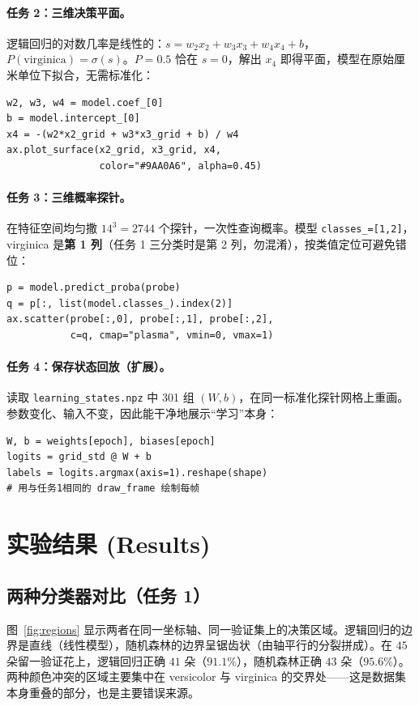 \documentclass[a4paper,11pt]{article}
\begin{document}
\paragraph{任务 2：三维决策平面。}
逻辑回归的对数几率是线性的：$s=w_2x_2+w_3x_3+w_4x_4+b$，$P(\text{virginica})=\sigma(s)$。$P=0.5$ 恰在 $s=0$，解出 $x_4$ 即得平面，模型在原始厘米单位下拟合，无需标准化：
\begin{lstlisting}
w2, w3, w4 = model.coef_[0]
b = model.intercept_[0]
x4 = -(w2*x2_grid + w3*x3_grid + b) / w4
ax.plot_surface(x2_grid, x3_grid, x4,
                color="#9AA0A6", alpha=0.45)
\end{lstlisting}

\paragraph{任务 3：三维概率探针。}
在特征空间均匀撒 $14^3=2744$ 个探针，一次性查询概率。模型 \texttt{classes\_=[1,2]}，virginica 是\textbf{第 1 列}（任务 1 三分类时是第 2 列，勿混淆），按类值定位可避免错位：
\begin{lstlisting}
p = model.predict_proba(probe)
q = p[:, list(model.classes_).index(2)]
ax.scatter(probe[:,0], probe[:,1], probe[:,2],
           c=q, cmap="plasma", vmin=0, vmax=1)
\end{lstlisting}

\paragraph{任务 4：保存状态回放（扩展）。}
读取 \texttt{learning\_states.npz} 中 301 组 $(W,b)$，在同一标准化探针网格上重画。参数变化、输入不变，因此能干净地展示``学习''本身：
\begin{lstlisting}
W, b = weights[epoch], biases[epoch]
logits = grid_std @ W + b
labels = logits.argmax(axis=1).reshape(shape)
# 用与任务1相同的 draw_frame 绘制每帧
\end{lstlisting}

\section{实验结果 (Results)}
\subsection{两种分类器对比（任务 1）}
图~\ref{fig:regions} 显示两者在同一坐标轴、同一验证集上的决策区域。逻辑回归的边界是直线（线性模型），随机森林的边界呈锯齿状（由轴平行的分裂拼成）。在 $45$ 朵留一验证花上，逻辑回归正确 $41$ 朵（$91.1\%$），随机森林正确 $43$ 朵（$95.6\%$）。两种颜色冲突的区域主要集中在 versicolor 与 virginica 的交界处——这是数据集本身重叠的部分，也是主要错误来源。
\end{document}

